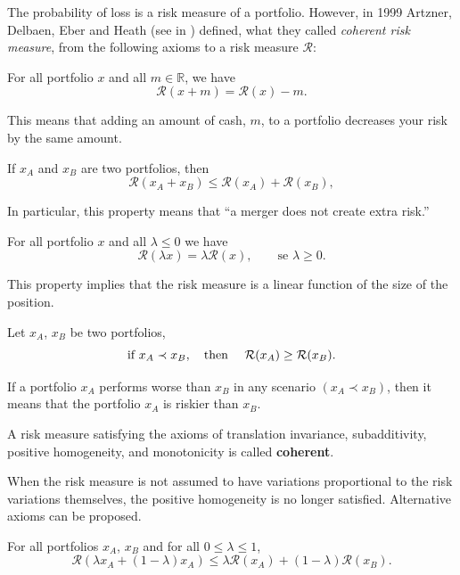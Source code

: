The probability of loss is a risk measure of a portfolio. However, in 1999 Artzner, Delbaen, Eber and Heath (see in \cite{Artzner1999}) defined, what they called \textit{coherent risk measure}, from the following axioms to a risk measure $\mathcal{R}$:


\begin{axiom} For all portfolio $x$ and all $m\in\mathbb{R}$,  we have
	\[
		\mathcal{R}(x+m) = \mathcal{R}(x)-m.
	\]
\end{axiom}
This means that adding an amount of cash, $m$, to a portfolio decreases your risk by the same amount.

\begin{axiom}[Subadditivity] If $x_A$ and $x_B$ are two portfolios, then
	\[
		\mathcal{R}(x_A+x_B) \leq \mathcal{R}(x_A) + \mathcal{R}(x_B),
	\]
\end{axiom}
In particular, this property means that ``a merger does not create extra risk.''

\begin{axiom} For all portfolio $x$ and all $\lambda\leq 0$ we have
	\[
		\mathcal{R}(\lambda x) = \lambda \mathcal{R}(x), \qquad \mbox{se } \lambda
		\geq 0.
	\]
\end{axiom}
This property implies that the risk measure is a linear function of the size of the position.

\begin{axiom}[Monotonicity] Let $x_A$, $x_B$ be two portfolios,
	\[
		\mbox{if } x_A \prec x_B, \quad \mbox{then } \quad \mathcal{R}(x_A) \geq \mathcal{R}(x_B).\\
	\]
\end{axiom}
If a portfolio $x_A$ performs worse than $x_B$ in any
scenario $(x_A \prec x_B)$, then it means that the portfolio $x_A$ is
riskier than $x_B$.

\begin{definition}
	A risk measure satisfying the axioms of translation invariance, subadditivity, positive homogeneity, and monotonicity is called \textbf{coherent}.
\end{definition}


When the risk measure is not assumed to have variations proportional to the risk variations themselves, the positive homogeneity is no longer satisfied. Alternative axioms can be proposed.

\begin{axiom}[Convexity] For all portfolios $x_A$, $x_B$ and for all $0\leq \lambda \leq 1$,
	\[
		\mathcal{R}(\lambda x_A + (1-\lambda)x_A) \leq \lambda \mathcal{R}(x_A) + (1-\lambda) \mathcal{R}(x_B).
	\]
\end{axiom}

